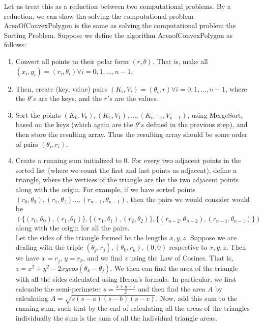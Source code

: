 \documentclass[11pt]{article}
\begin{document}
\begin{enumerate}
\begin{enumerate}
        Let us treat this as a reduction between two computational problems. By a reduction, we can show tha solving the computational problem AreaOfConvexPolygon is the same as solving the computational problem the Sorting Problem. 
        Suppose we define the algorithm AreaofConvexPolygon as follows: \\
        
        \begin{enumerate}
            \item Convert all points to their polar form $(r, \theta)$. That is, make all $(x_i, y_i) = (r_i, \theta_i) \forall i=0, 1, \dots, n-1$. 
            \item Then, create (key, value) pairs $(K_i, V_i) = (\theta_i, r) \forall i=0, 1, \dots, n-1$, where the $\theta 's$ are the keys, and the $r's$ are the values. 
            \item Sort the points $(K_0, V_0), (K_1, V_1), \dots, (K_{n-1}, V_{n-1})$, using MergeSort, based on the keys (which again are the $\theta 's$ defined in the previous step), and then store the resulting array. Thus the resulting array should be some order of pairs $(\theta_i, r_i)$.
            
            \item Create a running sum initialized to 0. For every two adjacent points in the sorted list (where we count the first and last points as adjacent), define a triangle, where the vertices of the triangle are the the two adjacent points along with the origin. For example, if we have sorted points $(r_0, \theta_0), (r_1, \theta_1) \dots, (r_{n-1}, \theta_{n-1})$, then the pairs we would consider would be $\left(\{(r_0, \theta_0), (r_1, \theta_1)\}, \{(r_{1}, \theta_{1}), (r_{2}, \theta_{2})\}, \{(r_{n-2}, \theta_{n-2}), (r_{n-1}, \theta_{n-1})\}\right)$ along with the origin for all the pairs.\\
            
            Let the sides of the triangle formed be the lengths $x, y, z$. Suppose we are dealing with the triple $(\theta_j, r_j), (\theta_k, r_k), (0,0)$ respective to $x, y, z$. Then we have $x=r_j$, $y=r_k$, and we find $z$ using the Law of Cosines. That is, $z = x^2 + y^2 - 2xycos(\theta_k - \theta_j)$. We then can find the area of the triangle with all the sides calculated using Heron's formula. In particular, we first calcualte the semi-perimeter $s = \frac{x+y+z}{2}$ and then find the area $A$ by calculating $A = \sqrt{s(s-a)(s-b)(s-c)}$. Now, add this sum to the running sum, such that by the end of calculating all the areas of the triangles individually the sum is the sum of all the individual triangle areas. 
            

\end{enumerate}
\end{enumerate}
\end{enumerate}
\end{document}
